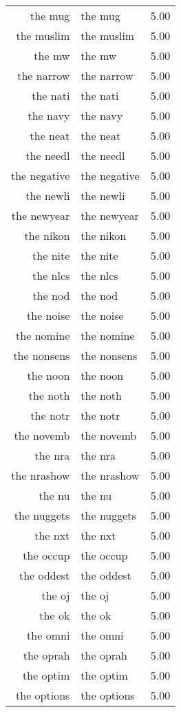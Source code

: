 \begin{table}[ht]
\begin{tabular}{rlr}
  the mug & the mug & 5.00 \\ 
  the muslim & the muslim & 5.00 \\ 
  the mw & the mw & 5.00 \\ 
  the narrow & the narrow & 5.00 \\ 
  the nati & the nati & 5.00 \\ 
  the navy & the navy & 5.00 \\ 
  the neat & the neat & 5.00 \\ 
  the needl & the needl & 5.00 \\ 
  the negative & the negative & 5.00 \\ 
  the newli & the newli & 5.00 \\ 
  the newyear & the newyear & 5.00 \\ 
  the nikon & the nikon & 5.00 \\ 
  the nite & the nite & 5.00 \\ 
  the nlcs & the nlcs & 5.00 \\ 
  the nod & the nod & 5.00 \\ 
  the noise & the noise & 5.00 \\ 
  the nomine & the nomine & 5.00 \\ 
  the nonsens & the nonsens & 5.00 \\ 
  the noon & the noon & 5.00 \\ 
  the noth & the noth & 5.00 \\ 
  the notr & the notr & 5.00 \\ 
  the novemb & the novemb & 5.00 \\ 
  the nra & the nra & 5.00 \\ 
  the nrashow & the nrashow & 5.00 \\ 
  the nu & the nu & 5.00 \\ 
  the nuggets & the nuggets & 5.00 \\ 
  the nxt & the nxt & 5.00 \\ 
  the occup & the occup & 5.00 \\ 
  the oddest & the oddest & 5.00 \\ 
  the oj & the oj & 5.00 \\ 
  the ok & the ok & 5.00 \\ 
  the omni & the omni & 5.00 \\ 
  the oprah & the oprah & 5.00 \\ 
  the optim & the optim & 5.00 \\ 
  the options & the options & 5.00 \\ 

\end{tabular}
\end{table}

